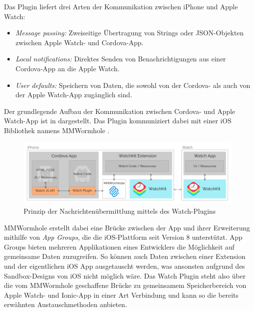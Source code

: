 Das Plugin liefert drei Arten der Kommunikation zwischen iPhone und Apple Watch:
\begin{itemize}
    \item \emph{Message passing:} Zweiseitige Übertragung von Strings oder JSON-Objekten zwischen Apple Watch- und Cordova-App.
    \item \emph{Local notifications:} Direktes Senden von Benachrichtigungen aus einer Cordova-App an die Apple Watch.
    \item \emph{User defaults:} Speichern von Daten, die sowohl von der Cordova- als auch von der Apple Watch-App zugänglich sind.
\end{itemize}
%
Der grundlegende Aufbau der Kommunikation zwischen Cordova- und Apple Watch-App ist in  dargestellt. Das Plugin kommuniziert dabei mit einer iOS Bibliothek namens MMWormhole \cite{gitMMWormhole}.
%
\begin{figure}[!htb] 
	\centering
	\includegraphics[width=\textwidth]{data/bilder/apple-watch-plugin.png}
	\caption{Prinzip der Nachrichtenübermittlung mittels des Watch-Plugins \cite{CrossleyCordovaAppleWatchPlugin}}
	\label{fig:watchPlugin}
\end{figure}
%
MMWormhole erstellt dabei eine Brücke zwischen der App und ihrer Erweiterung mithilfe von \emph{App Groups}, die die iOS-Plattform seit Version 8 unterstützt. App Groups bieten mehreren Applikationen eines Entwicklers die Möglichkeit auf gemeinsame Daten zuzugreifen. So können auch Daten zwischen einer Extension und der eigentlichen iOS App ausgetauscht werden, was ansonsten aufgrund des Sandbox-Designs von iOS nicht möglich wäre. Das Watch Plugin steht also über die vom MMWormhole geschaffene Brücke zu gemeinsamem Speicherbereich von Apple Watch- und Ionic-App in einer Art Verbindung und kann so die bereits erwähnten Austauschmethoden anbieten.
%
%
